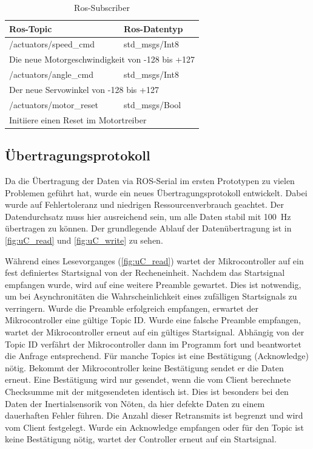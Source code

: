 \begin{table}[H]
  \centering
  \begin{tabularx}{\textwidth}{|l|l|}
    \hline
     Ros-Topic 			& Ros-Datentyp			 	\\ \hline\hline
    /actuators/speed\_cmd		& std\_msgs/Int8										\\ \hline	
      \multicolumn{2}{|X|}{Die neue Motorgeschwindigkeit von -128 bis +127}		\\ \hline\hline
    /actuators/angle\_cmd		& std\_msgs/Int8										\\ \hline	
     \multicolumn{2}{|X|}{Der neue Servowinkel von -128 bis +127}			\\ \hline\hline
    /actuators/motor\_reset		& std\_msgs/Bool										\\ \hline	
     \multicolumn{2}{|X|}{Initiiere einen Reset im Motortreiber}			\\ \hline
  \end{tabularx}
  \caption{Ros-Subscriber}%
  \label{tab:ros-sub}
\end{table}



\subsection{Übertragungsprotokoll}
Da die Übertragung der Daten via ROS-Serial im ersten Prototypen zu vielen Problemen geführt hat, wurde ein neues Übertragungsprotokoll entwickelt.
Dabei wurde auf Fehlertoleranz und niedrigen Ressourcenverbrauch geachtet. Der Datendurchsatz muss hier ausreichend sein, um alle Daten stabil mit \SI{100}{\hertz}
übertragen zu können.
Der grundlegende Ablauf der Datenübertragung ist in \cref{fig:uC_read} und \ref{fig:uC_write} zu sehen.

Während eines Lesevorganges (\cref{fig:uC_read}) wartet der Mikrocontroller auf ein fest definiertes Startsignal von der Recheneinheit. Nachdem das Startsignal empfangen wurde, wird auf eine weitere Preamble gewartet.
Dies ist notwendig, um bei Asynchronitäten die Wahrscheinlichkeit eines zufälligen Startsignals zu verringern. Wurde die Preamble erfolgreich empfangen, erwartet der Mikrocontroller eine gültige Topic ID.
Wurde eine falsche Preamble empfangen, wartet der Mikrocontroller erneut auf ein gültiges Startsignal. Abhängig von der Topic ID verfährt der Mikrocontroller dann im Programm fort und beantwortet
die Anfrage entsprechend. Für manche Topics ist eine Bestätigung (Acknowledge) nötig. Bekommt der Mikrocontroller keine Bestätigung sendet er die Daten erneut. Eine Bestätigung wird nur gesendet,
wenn die vom Client berechnete Checksumme mit der mitgesendeten identisch ist. Dies ist besonders bei den Daten der Inertialsensorik von Nöten, da hier defekte Daten zu einem dauerhaften Fehler führen. 
Die Anzahl dieser Retransmits ist begrenzt und wird vom Client festgelegt. Wurde ein Acknowledge empfangen oder für den Topic ist keine Bestätigung
nötig, wartet der Controller erneut auf ein Startsignal.

